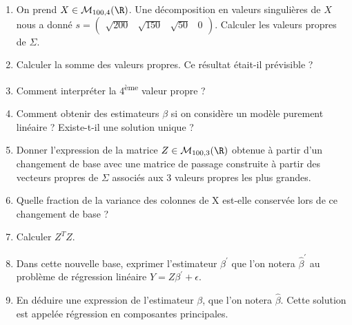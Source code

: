 \documentclass[solutions]{../exercices}
\begin{document}
\begin{exercice}
		\begin{enumerate}
			\item On prend $X \in \mathcal{M}_{100,4}(\R)$. Une décomposition en valeurs singulières de $X$ nous a donné $s = \begin{pmatrix}\sqrt{200} & \sqrt{150} & \sqrt{50} & 0 \end{pmatrix}$. Calculer les valeurs propres de $\Sigma$.
			\item Calculer la somme des valeurs propres. Ce résultat était-il prévisible ?
			\item Comment interpréter la 4\textsuperscript{ème} valeur propre ?
			\item Comment obtenir des estimateurs $\beta$ si on considère un modèle purement linéaire ? Existe-t-il une solution unique ?
			\item Donner l'expression de la matrice $Z \in \mathcal{M}_{100,3}(\R)$ obtenue à partir d'un changement de base avec une matrice de passage construite à partir des vecteurs propres de $\Sigma$ associés aux 3 valeurs propres les plus grandes.
			\item Quelle fraction de la variance des colonnes de X est-elle conservée lors de ce changement de base ?
			\item Calculer $Z^T Z$.
			\item Dans cette nouvelle base, exprimer l'estimateur $\beta^{'}$ que l'on notera $\hat{\beta}^{'}$ au problème de régression linéaire $Y = Z \beta^{'} + \epsilon$.
			\item En déduire une expression de l'estimateur $\beta$, que l'on notera $\hat{\beta}$. Cette solution est appelée régression en composantes principales.
		\end{enumerate}
	\end{exercice}
\end{document}
